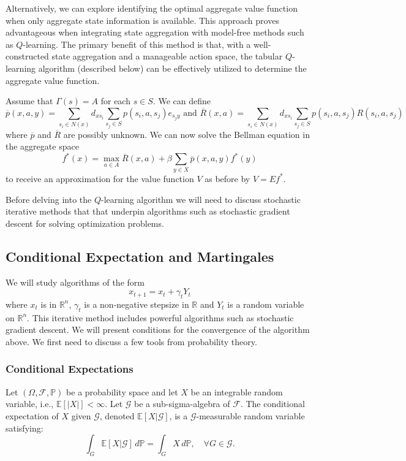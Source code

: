 \documentclass[letter,11pt]{article}
\begin{document}
Alternatively, we can explore identifying the optimal aggregate value function when only aggregate state information is available. This approach proves advantageous when integrating state aggregation with model-free methods such as \(Q\)-learning. The primary benefit of this method is that, with a well-constructed state aggregation and a manageable action space, the tabular \(Q\)-learning algorithm (described below) can be effectively utilized to determine the aggregate value function. 

Assume that $\Gamma (s) = A$ for each $s \in S$. We can define 
$$\overline{p}(x,a,y) = \sum _{s_{i} \in N(x)} d_{x s_{i}} \sum _{s_{j} \in S} p(s_{i},a,s_{j})e_{s_{j}y} \text { and } \overline{R}(x,a) =  \sum _{s_{i} \in N(x)} d_{x s_{i}} \sum _{s_{j} \in S} p(s_{i},a,s_{j}) R(s_{i},a,s_{j}) $$
where $\overline{p}$ and $\overline{R}$ are possibly unknown. We can now solve the Bellman equation in the aggregate space
$$ f^{*}(x) = \max _{a \in A} \overline{R}(x,a) + \beta \sum _{y \in X} \overline{p}(x,a,y) f^{*}(y) $$
to receive an approximation for the value function $V$ as before by $ \hat{V} = Ef^{*}$. 


Before delving into the $Q$-learning algorithm we will need to discuss stochastic iterative methods that that underpin algorithms such as stochastic gradient descent for solving optimization problems. 



\subsection{Conditional Expectation and Martingales} \label{Section:Martingales}

We will study algorithms of the form 
\begin{equation*}
x_{t+1} = x_{t} + \gamma_{t} Y_{t}
\end{equation*}
where $x_{t}$ is in $\mathbb{R}^{n}$, $\gamma_{t}$ is a non-negative stepsize in $\mathbb{R}$ and $Y_{t}$ is a random variable on $\mathbb{R}^{n}$. This iterative method includes powerful algorithms such as stochastic gradient descent. We will present conditions for the convergence of the algorithm above. We first need to discuss a few tools from probability theory. 
\subsubsection{Conditional Expectations}

Let \( (\Omega, \mathcal{F}, \mathbb{P}) \) be a probability space and let \( X \) be an integrable random variable, i.e., \( \mathbb{E}[|X|] < \infty \). Let \( \mathcal{G} \) be a sub-sigma-algebra of \( \mathcal{F} \). The conditional expectation of \( X \) given \( \mathcal{G} \), denoted \( \mathbb{E}[X | \mathcal{G}] \), is a \( \mathcal{G} \)-measurable random variable satisfying:
\[
\int_G \mathbb{E}[X | \mathcal{G}] \, d\mathbb{P} = \int_G X \, d\mathbb{P}, \quad \forall G \in \mathcal{G}.
\]
\end{document}
